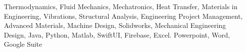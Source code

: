 

\begin{cvparagraph}

Thermodynamics, Fluid Mechanics, Mechatronics, Heat Transfer, Materials in Engineering, Vibrations, Structural Analysis, Engineering Project Management, Advanced Materials, Machine Design, Solidworks, Mechanical Engineering Design, Java, Python, Matlab, SwiftUI, Firebase, Excel. Powerpoint, Word, Google Suite
\end{cvparagraph}
